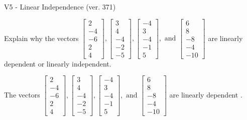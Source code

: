 \begin{exercise}
  \begin{exerciseTitle}V5 - Linear Independence (ver. 371)\end{exerciseTitle}
  \begin{exerciseStatement}
    Explain why the vectors \(\left[\begin{array}{r}
2 \\
-4 \\
-6 \\
2 \\
4
\end{array}\right] , \left[\begin{array}{r}
3 \\
4 \\
-4 \\
-2 \\
-5
\end{array}\right] , \left[\begin{array}{r}
-4 \\
3 \\
-4 \\
-1 \\
5
\end{array}\right] , \text{ and } \left[\begin{array}{r}
6 \\
8 \\
-8 \\
-4 \\
-10
\end{array}\right]\) are linearly dependent or linearly independent.	


  \end{exerciseStatement}
  \begin{exerciseAnswer}
   The vectors \(\left[\begin{array}{r}
2 \\
-4 \\
-6 \\
2 \\
4
\end{array}\right] , \left[\begin{array}{r}
3 \\
4 \\
-4 \\
-2 \\
-5
\end{array}\right] , \left[\begin{array}{r}
-4 \\
3 \\
-4 \\
-1 \\
5
\end{array}\right] , \text{ and } \left[\begin{array}{r}
6 \\
8 \\
-8 \\
-4 \\
-10
\end{array}\right]\) are 
  	 linearly dependent  .
  


  \end{exerciseAnswer}
\end{exercise}